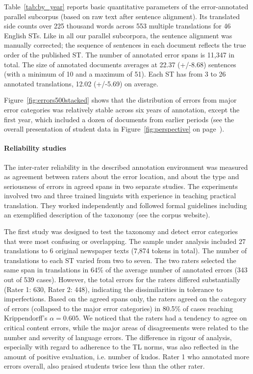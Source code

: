 Table~\ref{tab:by_year} reports basic quantitative parameters of the error-annotated parallel subcorpus (based on raw text after sentence alignment). Its translated side counts over 225 thousand words across 553 multiple translations for 46 English STs. Like in all our parallel subcorpora, the sentence alignment was manually corrected; the sequence of sentences in each document reflects the true order of the published ST. The number of annotated error spans is 11,347 in total. The size of annotated documents averages at 22.37 (+/-8.68) sentences (with a minimum of 10 and a maximum of 51). Each ST has from 3 to 26 annotated translations, 12.02 (+/-5.69) on average.

Figure~\ref{fig:errors500stacked} shows that the distribution of errors from major error categories was relatively stable across six years of annotation, except the first year, which included a dozen of documents from earlier periods (see the overall presentation of student data in Figure~\ref{fig:perspective} on page~\pageref{fig:perspective}). 


\paragraph{Reliability studies}
The inter-rater reliability in the described annotation environment was measured as agreement between raters about the error location, and about the type and seriousness of errors in agreed spans in two separate studies. The experiments involved two and three trained linguists with experience in teaching practical translation. They worked independently and followed formal guidelines including an exemplified description of the taxonomy (see the corpus website).

The first study was designed to test the taxonomy and detect error categories that were most confusing or overlapping. The sample under analysis included 27 translations to 6 original newspaper texts (7,874 tokens in total). The number of translations to each ST varied from two to seven.
The two raters selected the same span in translations in 64\% of the average number of annotated errors (343 out of 539 cases). However, the total errors for the raters differed substantially (Rater 1: 630, Rater 2: 448), indicating the dissimilarities in tolerance to imperfections. 
Based on the agreed spans only, the raters agreed on the category of errors (collapsed to the major error categories) in 80.5\% of cases reaching Krippendorff's $\alpha=0.605$. %
We noticed that the raters had a tendency to agree on critical content errors, while the major areas of disagreements were related to the number and severity of language errors. The difference in rigour of analysis, especially with regard to adherence to the TL norms, was also reflected in the amount of positive evaluation, i.e. number of kudos. Rater 1 who annotated more errors overall, also praised students twice less than the other rater. 

